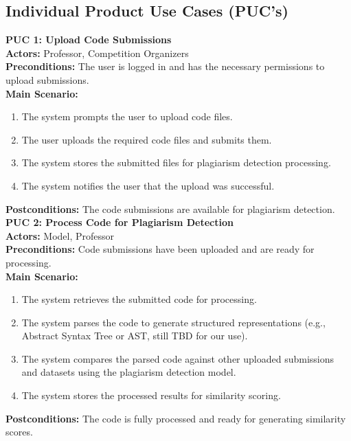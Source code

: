 \documentclass[12pt]{article}
\begin{document}
\subsection{Individual Product Use Cases (PUC's)}
\textbf{PUC 1: Upload Code Submissions}\\
\textbf{Actors:} Professor, Competition Organizers\\
\textbf{Preconditions:} The user is logged in and has the necessary permissions to upload submissions.\\
\textbf{Main Scenario:}
\begin{enumerate}
    \item The system prompts the user to upload code files.
    \item The user uploads the required code files and submits them.
    \item The system stores the submitted files for plagiarism detection processing.
    \item The system notifies the user that the upload was successful.
\end{enumerate}
\textbf{Postconditions:} The code submissions are available for plagiarism detection.\\[0.2cm]

\textbf{PUC 2: Process Code for Plagiarism Detection}\\
\textbf{Actors:} Model, Professor\\
\textbf{Preconditions:} Code submissions have been uploaded and are ready for processing.\\
\textbf{Main Scenario:}
\begin{enumerate}
    \item The system retrieves the submitted code for processing.
    \item The system parses the code to generate structured representations (e.g., Abstract Syntax Tree or AST, still TBD for our use).
    \item The system compares the parsed code against other uploaded submissions and datasets using the plagiarism detection model.
    \item The system stores the processed results for similarity scoring.
\end{enumerate}
\textbf{Postconditions:} The code is fully processed and ready for generating similarity scores.\\[0.2cm]
\end{document}
